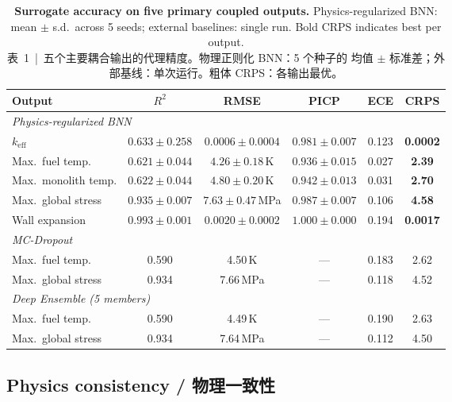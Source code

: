 \documentclass[11pt,a4paper]{article}
\newcommand{\keff}{\ensuremath{k_{\mathrm{eff}}}}
\begin{document}
\begin{table}[htbp]
\centering
\caption{\textbf{Surrogate accuracy on five primary coupled outputs.}
Physics-regularized BNN: mean $\pm$ s.d.\ across 5 seeds; external
baselines: single run. Bold CRPS indicates best per output.\\
\small 表~1~|~五个主要耦合输出的代理精度。物理正则化 BNN：5 个种子的
均值 $\pm$ 标准差；外部基线：单次运行。粗体 CRPS：各输出最优。}
\label{tab:accuracy}
\smallskip
\small
\begin{tabular}{lccccc}
\toprule
Output & $R^2$ & RMSE & PICP & ECE & CRPS \\
\midrule
\multicolumn{6}{l}{\textit{Physics-regularized BNN}} \\
\quad \keff{}
  & $0.633 \pm 0.258$
  & $0.0006 \pm 0.0004$
  & $0.981 \pm 0.007$
  & 0.123
  & \textbf{0.0002} \\
\quad Max.\ fuel temp.
  & $0.621 \pm 0.044$
  & $4.26 \pm 0.18$\,K
  & $0.936 \pm 0.015$
  & 0.027
  & \textbf{2.39} \\
\quad Max.\ monolith temp.
  & $0.622 \pm 0.044$
  & $4.80 \pm 0.20$\,K
  & $0.942 \pm 0.013$
  & 0.031
  & \textbf{2.70} \\
\quad Max.\ global stress
  & $0.935 \pm 0.007$
  & $7.63 \pm 0.47$\,MPa
  & $0.987 \pm 0.007$
  & 0.106
  & \textbf{4.58} \\
\quad Wall expansion
  & $0.993 \pm 0.001$
  & $0.0020 \pm 0.0002$
  & $1.000 \pm 0.000$
  & 0.194
  & \textbf{0.0017} \\
\midrule
\multicolumn{6}{l}{\textit{MC-Dropout}} \\
\quad Max.\ fuel temp.
  & 0.590  & 4.50\,K  & ---  & 0.183  & 2.62 \\
\quad Max.\ global stress
  & 0.934  & 7.66\,MPa  & ---  & 0.118  & 4.52 \\
\midrule
\multicolumn{6}{l}{\textit{Deep Ensemble (5 members)}} \\
\quad Max.\ fuel temp.
  & 0.590  & 4.49\,K  & ---  & 0.190  & 2.63 \\
\quad Max.\ global stress
  & 0.934  & 7.64\,MPa  & ---  & 0.112  & 4.50 \\
\bottomrule
\end{tabular}
\end{table}


\subsection{Physics consistency / 物理一致性}
\end{document}

